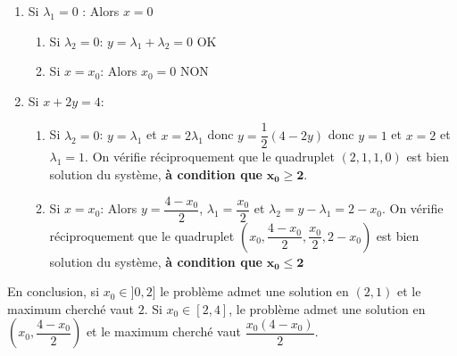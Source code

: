 \documentclass{fancybook}
\begin{document}
\begin{enumerate}
\item Si $\lambda_1=0$ : \newline
Alors $x=0$
\begin{enumerate}
\item Si $\lambda_2=0$: \newline
$y=\lambda_1+\lambda_2=0$ \quad OK
\item Si $x=x_0$:
Alors $x_0=0$ \quad NON
\end{enumerate}
\item Si $x+2y=4$:
\begin{enumerate}
\item Si $\lambda_2=0$: \newline
$y=\lambda_1$ et $x=2\lambda_1$ donc $y=\dfrac 12 (4-2y)$ donc $y=1$ et $x=2$ et $\lambda_1=1$. \newline
On vérifie réciproquement que le quadruplet $(2,1,1,0)$ est bien solution du système, \textbf{à condition que} $\mathbf{x_0\geq 2}$.
\item Si $x=x_0$: \newline
Alors $y=\dfrac{4-x_0}{2}$, $\lambda_1=\dfrac{x_0}{2}$ et $\lambda_2=y-\lambda_1=2-x_0$.\newline
On vérifie réciproquement que le quadruplet $(x_0,\dfrac{4-x_0}{2},\dfrac{x_0}{2},2-x_0)$ est bien solution du système, \textbf{à condition que} $\mathbf{x_0\leq 2}$
\end{enumerate}
\end{enumerate}
En conclusion, si $x_0\in ]0,2]$ le problème admet une solution en $(2,1)$ et le maximum cherché vaut $2$. \newline
Si $x_0\in [2, 4]$, le problème admet une solution en $(x_0,\dfrac{4-x_0}{2})$ et le maximum cherché vaut $\dfrac{x_0(4-x_0)}{2}$.

\begin{exercice}
\end{exercice}
\end{document}
